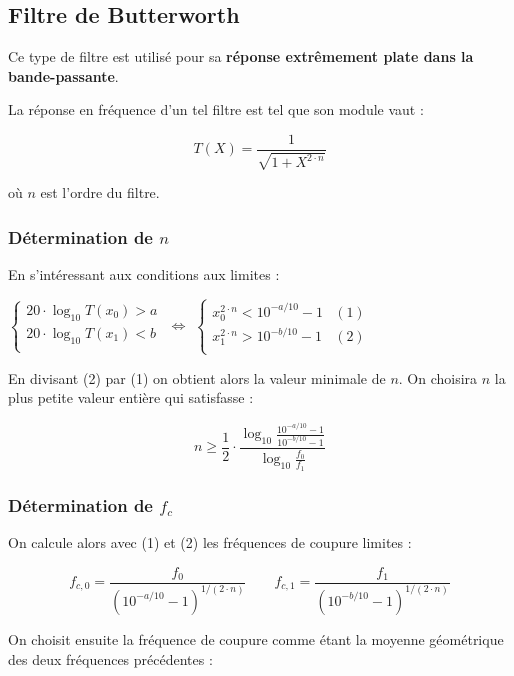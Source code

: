 \documentclass[a4paper,french]{paper}
\begin{document}
\newpage
\subsection*{Filtre de Butterworth}

Ce type de filtre est utilisé pour sa \textbf{réponse extrêmement plate dans la bande-passante}.


La réponse en fréquence d'un tel filtre est tel que son module vaut :

$$ T(X) = \frac{1}{\sqrt{1 + X^{2\cdot n}}}$$

où $n$ est l'ordre du filtre.

\subsubsection*{Détermination de $n$}
En s'intéressant aux conditions aux limites :


$
\left\{
    \begin{array}{ll}
        20 \cdot \log_{10} T(x_0) > a \\
        20 \cdot \log_{10} T(x_1) < b \\
    \end{array}    
\right. 
$
$\Leftrightarrow$
$
\left\{
    \begin{array}{ll}
        x_0^{2\cdot n} < 10^{-a/10} - 1 & (1)\\
        x_1^{2\cdot n} > 10^{-b/10} - 1 & (2)\\
    \end{array}    
\right. 
$

\medskip

En divisant (2) par (1) on obtient alors la valeur minimale de $n$. On choisira $n$ la plus petite valeur entière qui satisfasse :

$$ n \ge \frac{1}{2} \cdot \frac{\log_{10} \frac{10^{-a/10} - 1}{10^{-b/10} - 1}}{\log_{10} \frac{f_0}{f_1}}$$


\subsubsection*{Détermination de $f_c$}

On calcule alors avec (1) et (2) les fréquences de coupure limites :

$$f_{c,0} = \frac{f_0}{(10^{-a/10} - 1)^{1/(2\cdot n)}} \qquad f_{c,1} = \frac{f_1}{(10^{-b/10} - 1)^{1/(2\cdot n)}}$$

On choisit ensuite la fréquence de coupure comme étant la moyenne géométrique des deux fréquences précédentes :
\end{document}
